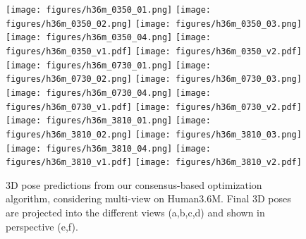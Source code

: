 \documentclass[10pt,twocolumn,letterpaper]{article}
\begin{document}
\begin{figure*}[!h]
  \centering
  \texttt{[image: figures/h36m\_0350\_01.png]}
  \texttt{[image: figures/h36m\_0350\_02.png]}
  \texttt{[image: figures/h36m\_0350\_03.png]}
  \texttt{[image: figures/h36m\_0350\_04.png]}\hspace{0.1cm}
  \texttt{[image: figures/h36m\_0350\_v1.pdf]}
  \texttt{[image: figures/h36m\_0350\_v2.pdf]}\\\vspace{0.01cm}
\texttt{[image: figures/h36m\_0730\_01.png]}
  \texttt{[image: figures/h36m\_0730\_02.png]}
  \texttt{[image: figures/h36m\_0730\_03.png]}
  \texttt{[image: figures/h36m\_0730\_04.png]}\hspace{0.1cm}
  \texttt{[image: figures/h36m\_0730\_v1.pdf]}
  \texttt{[image: figures/h36m\_0730\_v2.pdf]}\\\vspace{0.01cm}
\texttt{[image: figures/h36m\_3810\_01.png]}
  \texttt{[image: figures/h36m\_3810\_02.png]}
  \texttt{[image: figures/h36m\_3810\_03.png]}
  \texttt{[image: figures/h36m\_3810\_04.png]}\hspace{0.1cm}
  \texttt{[image: figures/h36m\_3810\_v1.pdf]}
  \texttt{[image: figures/h36m\_3810\_v2.pdf]}\\\vspace{0.01cm}
  \caption{
    3D pose predictions from our consensus-based optimization algorithm, considering multi-view on Human3.6M.
    Final 3D poses are projected into the different views (a,b,c,d) and shown in perspective (e,f).
  }
  \label{fig:predictions_h36m}
\end{figure*}
\end{document}
